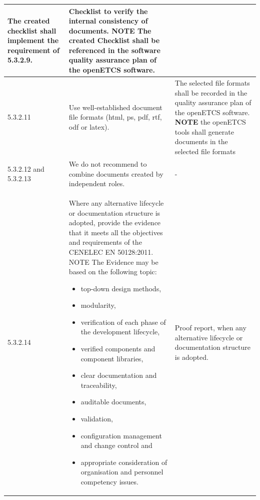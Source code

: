 \documentclass{template/openetcs_report}
\begin{document}
{\begin{longtable}{|p{2cm}|p{9cm}|p{3cm}|}
The created checklist shall implement the requirement of 5.3.2.9.
& Checklist to verify the internal consistency of documents.
\linebreak
\linebreak
NOTE\linebreak
The created Checklist shall be referenced in the software quality assurance plan of the openETCS software.\\ 
\hline
5.3.2.11 & Use well-established document file formats (html, ps, pdf, rtf, odf or latex).
& The selected file formats shall be recorded in the quality assurance plan of the openETCS software.
\linebreak
\linebreak
\textbf{NOTE}\linebreak
the openETCS tools shall generate documents in the selected file formats\\ 
\hline
5.3.2.12 and 5.3.2.13 & We do not recommend to combine documents created by independent roles. 
& - \\ 
\hline
5.3.2.14 & Where any alternative lifecycle or documentation structure is adopted, provide the evidence that it meets all the objectives and requirements of the CENELEC EN 50128:2011.
\linebreak
\linebreak
NOTE\linebreak
The Evidence may be based on the following topic:
\begin{itemize}\itemsep=0pt
  \item top-down design methods,
  \item modularity,
  \item verification of each phase of the development lifecycle,
  \item verified components and component libraries,
  \item clear documentation and traceability,
  \item auditable documents,
  \item validation,
  \item configuration management and change control and
  \item appropriate consideration of organisation and personnel competency issues.
\end{itemize}
& Proof report, when any alternative lifecycle or documentation structure is adopted.\\ 
\hline
\end{longtable}}
\end{document}
